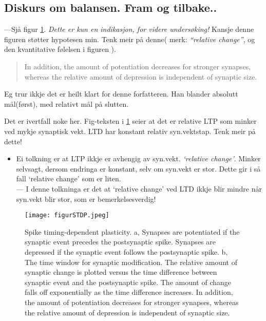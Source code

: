 \subsection{Diskurs om balansen. Fram og tilbake..}
\label{diskursOmLTPLTD}
---Sjå figur \ref{figur_STDP}. \emph{Dette er kun en indikasjon, for videre undersøking!} Kansje denne figuren støtter hypotesen min. Tenk meir på denne( merk: \emph{``relative change''}, og den kvantitative følelsen i figuren ).
\begin{quote}
In addition, the amount of potentiation decreases for stronger synapses, whereas the relative amount of depression is independent of synaptic size.
\end{quote}
Eg trur ikkje det er heilt klart for denne forfatteren. Han blander absolutt mål(først), med relativt mål på slutten.

Det er ivertfall noke her. Fig-teksten i \ref{figur_STDP} seier at det er relative LTP som minker ved mykje synaptisk vekt. LTD har konstant relativ syn.vektstap. Tenk meir på dette!
\begin{itemize}
	\item Ei tolkning er at LTP ikkje er avhengig av syn.vekt. \emph{`relative change'}. Minker selvsagt, dersom endringa er konstant, selv om syn.vekt er stor. Dette gir i så fall `relative change' som er liten.\\
--- I denne tolkninga er det at `relative change' ved LTD ikkje blir mindre når syn.vekt blir stor, som er bemerkelsesverdig!
\end{itemize}
\begin{figure}[!htbp]
	\label{figur_STDP}
	\centering
	\texttt{[image: figurSTDP.jpeg]}
	\caption{Spike timing-dependent plasticity. a, Synapses are potentiated if the synaptic event precedes the postsynaptic spike. Synapses are depressed if the synaptic event follows the postsynaptic spike. b, The time window for synaptic modification. The relative amount of synaptic change is plotted versus the time difference between synaptic event and the postsynaptic spike. The amount of change falls off exponentially as the time difference increases. In addition, the amount of potentiation decreases for stronger synapses, whereas the relative amount of depression is independent of synaptic size.}
\end{figure}


